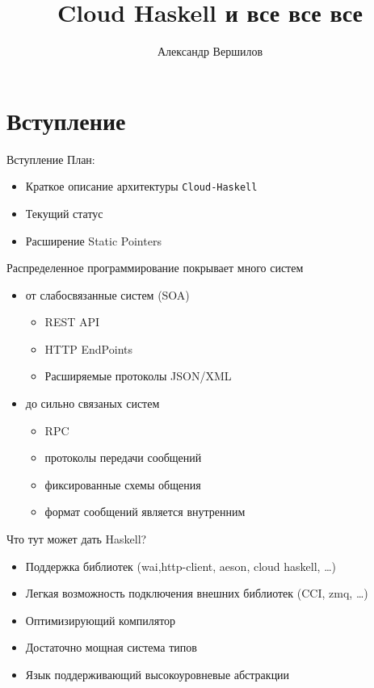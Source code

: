 \documentclass{beamer}
\title[Cloud Haskell]{Cloud Haskell и все все все}
\author{Александр Вершилов}
\begin{document}
\section{Вступление}
\begin{frame}{Вступление}
  План:
  \begin{itemize}
    \item Краткое описание архитектуры \texttt{Cloud-Haskell}
    \item Текущий статус
    \item Расширение Static Pointers
  \end{itemize}
\end{frame}

\begin{frame}{}
  Распределенное программирование покрывает много систем
  \begin{itemize}
    \item от слабосвязанные систем (SOA)
      \begin{itemize}
        \item REST API
        \item HTTP EndPoints
        \item Расширяемые протоколы JSON/XML
      \end{itemize}
    \item до сильно связаных систем
      \begin{itemize}
        \item RPC
        \item протоколы передачи сообщений
        \item фиксированные схемы общения
        \item формат сообщений является внутренним
      \end{itemize}
  \end{itemize}
\end{frame}

\begin{frame}{Что тут может дать Haskell?} \begin{itemize}
    \item Поддержка библиотек (wai,http-client, aeson, cloud haskell, \ldots)
    \item Легкая возможность подключения внешних библиотек (CCI, zmq, \ldots)
    \item Оптимизирующий компилятор
    \item Достаточно мощная система типов
    \item Язык поддерживающий высокоуровневые абстракции
  \end{itemize}
\end{frame}
\end{document}
